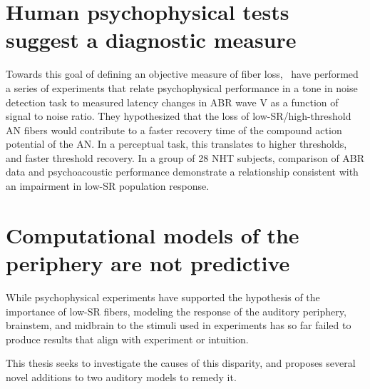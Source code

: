 \section{Human psychophysical tests suggest a diagnostic measure}

Towards this goal of defining an objective measure of fiber loss,~\cite{Mehraei2015Individual,Mehraei2016Auditory} have performed a series of experiments that relate psychophysical performance in a tone in noise detection task to measured latency changes in ABR wave V as a function of signal to noise ratio.  They hypothesized that the loss of low-SR/high-threshold AN fibers would contribute to a faster recovery time of the compound action potential of the AN.  In a perceptual task, this translates to higher thresholds, and faster threshold recovery. In a group of 28 NHT subjects, comparison of ABR data and psychoacoustic performance demonstrate a relationship consistent with an impairment in low-SR population response.

\section{Computational models of the periphery are not predictive}

While psychophysical experiments have supported the hypothesis of the importance of low-SR fibers, modeling the response of the auditory periphery, brainstem, and midbrain to the stimuli used in experiments has so far failed to produce results that align with experiment or intuition.

This thesis seeks to investigate the causes of this disparity, and proposes several novel additions to two auditory models to remedy it. 


